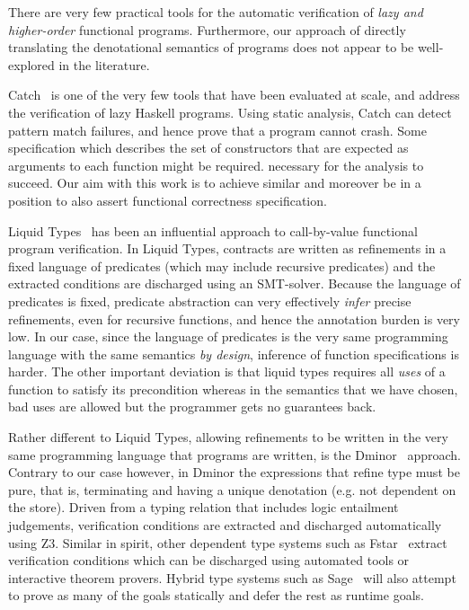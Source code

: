 There are very few practical tools for the automatic
verification of {\em lazy and higher-order} functional programs.
Furthermore, our approach of directly translating the denotational semantics of
programs does not appear to be well-explored in the literature.

Catch~\cite{Mitchell:2008:PBE:1411286.1411293} is one of the very few tools that
have been evaluated at scale, and address the verification of lazy Haskell
programs. Using static analysis, Catch can detect pattern match failures, and hence
prove that a program cannot crash. Some specification which describes the set of
constructors that are expected as arguments to each function might be required.
necessary for the analysis to succeed. Our aim with this work is to achieve similar and
moreover be in a position to also assert functional correctness specification.

Liquid Types~\cite{Rondon:2008:LT:1375581.1375602} has been an influential
approach to call-by-value functional program verification. In Liquid Types,
contracts are written as refinements in a fixed language of predicates (which may
include recursive predicates) and the extracted conditions are discharged using an
SMT-solver. Because the language of predicates is fixed, predicate abstraction can
very effectively {\em infer} precise refinements, even for recursive functions, and
hence the annotation burden is very low. In our case, since the language of predicates
is the very same programming language with the same semantics {\em by design}, inference
of function specifications is harder. The other important deviation is that liquid types
requires all {\em uses} of a function to satisfy its precondition whereas in the semantics
that we have chosen, bad uses are allowed but the programmer gets no guarantees back.

Rather different to Liquid Types, allowing refinements to be written
in the very same programming language that programs are written, is the
Dminor~\cite{Bierman+:subtyping} approach. Contrary to our case however, in Dminor
the expressions that refine type must be pure, that is, terminating and having a unique
denotation (e.g. not dependent on the store). Driven from a typing relation that includes
logic entailment judgements, verification conditions are extracted and discharged automatically using Z3.
Similar in spirit, other dependent type systems such
as Fstar~\cite{fstar} extract verification conditions which can be discharged
using automated tools
or interactive theorem provers. Hybrid type systems such as Sage~\cite{Knowles+:sage}
will also attempt to prove as many of the goals statically and defer the rest as runtime
goals.

